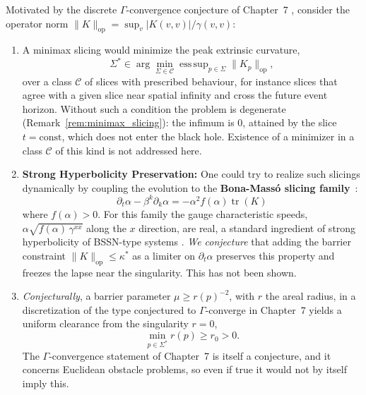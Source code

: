 \documentclass[11pt,reqno]{amsart}
\theoremstyle{definition}
\newcommand{\op}{\mathrm{op}}
\numberwithin{equation}{section}
\begin{document}
Motivated by the discrete $\Gamma$-convergence conjecture of Chapter~7 \cite{silvafilho2026minimax}, consider the operator norm $\|K\|_{\op} = \sup_{v} |K(v,v)| / \gamma(v,v)$:
\begin{enumerate}
    \item A minimax slicing would minimize the peak extrinsic curvature,
    \begin{equation}
    \Sigma^* \in \arg\min_{\Sigma \in \mathcal{C}} \operatorname{ess\,sup}_{p \in \Sigma} \|K_p\|_{\op},
    \end{equation}
    over a class $\mathcal{C}$ of slices with prescribed behaviour, for instance slices that agree with a given slice near spatial infinity and cross the future event horizon. Without such a condition the problem is degenerate (Remark~\ref{rem:minimax_slicing}): the infimum is $0$, attained by the slice $t = \text{const}$, which does not enter the black hole. Existence of a minimizer in a class $\mathcal{C}$ of this kind is not addressed here.
    \item \textbf{Strong Hyperbolicity Preservation:} One could try to realize such slicings dynamically by coupling the evolution to the \textbf{Bona-Mass\'o slicing family}~\cite{bona1995}:
    \begin{equation}
    \partial_t \alpha - \beta^k \partial_k \alpha = -\alpha^2 f(\alpha) \operatorname{tr}(K)
    \end{equation}
    where $f(\alpha) > 0$. For this family the gauge characteristic speeds, $\alpha\sqrt{f(\alpha)\,\gamma^{xx}}$ along the $x$ direction, are real, a standard ingredient of strong hyperbolicity of BSSN-type systems \cite{gourgoulhon2012}. \emph{We conjecture} that adding the barrier constraint $\|K\|_{\op} \le \kappa^*$ as a limiter on $\partial_t\alpha$ preserves this property and freezes the lapse near the singularity. This has not been shown.
    \item \emph{Conjecturally}, a barrier parameter $\mu \ge r(p)^{-2}$, with $r$ the areal radius, in a discretization of the type conjectured to $\Gamma$-converge in Chapter~7 yields a uniform clearance from the singularity $r = 0$,
    \begin{equation}
    \min_{p \in \Sigma^*} r(p) \ge r_0 > 0 .
    \end{equation}
    The $\Gamma$-convergence statement of Chapter~7 is itself a conjecture, and it concerns Euclidean obstacle problems, so even if true it would not by itself imply this.
\end{enumerate}
\end{document}
